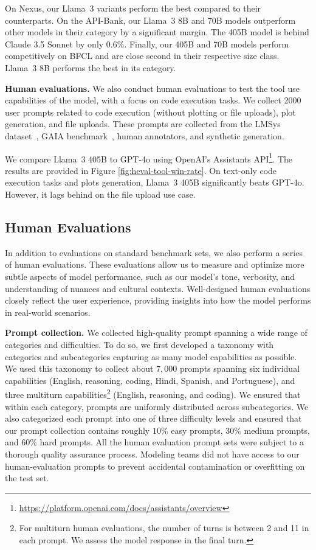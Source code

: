 On Nexus, our Llama~3 variants perform the best compared to their counterparts. On the API-Bank, our Llama~3 8B and 70B models outperform other models in their category by a significant margin. The 405B model is behind Claude 3.5 Sonnet by only 0.6\%. Finally, our 405B and 70B models perform competitively on BFCL and are close second in their respective size class. Llama~3 8B performs the best in its category.

\textbf{Human evaluations.} We also conduct human evaluations to test the tool use capabilities of the model, with a focus on code execution tasks. We collect 2000 user prompts related to code execution (without plotting or file uploads), plot generation, and file uploads. These prompts are collected from the LMSys dataset~\citep{chiang2024chatbot}, GAIA benchmark~\citep{mialon2023gaia}, human annotators, and synthetic generation.

We compare Llama~3 405B to GPT-4o using OpenAI's Assistants API\footnote{\url{https://platform.openai.com/docs/assistants/overview}}.
The results are provided in Figure \ref{fig:heval-tool-win-rate}. On text-only code execution tasks and plots generation, Llama~3 405B significantly beats GPT-4o. However, it lags behind on the file upload use case.

\subsection{Human Evaluations}
\label{section:human_evals}

In addition to evaluations on standard benchmark sets, we also perform a series of human evaluations. These evaluations allow us to measure and optimize more subtle aspects of model performance, such as our model's tone, verbosity, and understanding of nuances and cultural contexts. Well-designed human evaluations closely reflect the user experience, providing insights into how the model performs in real-world scenarios.

\textbf{Prompt collection.} We collected high-quality prompt spanning a wide range of categories and difficulties. To do so, we first developed a taxonomy with categories and subcategories capturing as many model capabilities as possible. We used this taxonomy to collect about $7,000$ prompts spanning six individual capabilities (English, reasoning, coding, Hindi, Spanish, and Portuguese), and three multiturn capabilities\footnote{For multiturn human evaluations, the number of turns is between 2 and 11 in each prompt. We assess the model response in the final turn.} (English, reasoning, and coding). We ensured that within each category, prompts are uniformly distributed across subcategories. We also categorized each prompt into one of three difficulty levels and ensured that our prompt collection contains roughly $10\%$ easy prompts, $30\%$ medium prompts, and $60\%$ hard prompts. All the human evaluation prompt sets were subject to a thorough quality assurance process. Modeling teams did not have access to our human-evaluation prompts to prevent accidental contamination or overfitting on the test set.

